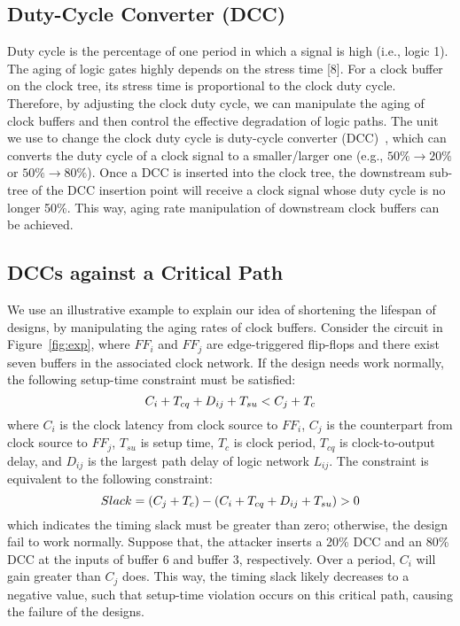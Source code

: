\subsection{Duty-Cycle Converter (DCC)}
Duty cycle is the percentage of one period in which a signal is high (i.e., logic 1). The aging of logic gates highly depends on the stress time [8]. For a clock buffer on the clock tree, its stress time is proportional to the clock duty cycle. Therefore, by adjusting the clock duty cycle, we can manipulate the aging of clock buffers and then control the effective degradation of logic paths. The unit we use to change the clock duty cycle is duty-cycle converter (DCC)~\cite{wu2018maui}, which can converts the duty cycle of a clock signal to a smaller/larger one (e.g., $50\% \rightarrow 20\%$ or $50\% \rightarrow 80\%$). Once a DCC is inserted into the clock tree, the downstream sub-tree of the DCC insertion point will receive a clock signal whose duty cycle is no longer 50\%. This way, aging rate manipulation of downstream clock buffers can be achieved.
\subsection{DCCs against a Critical Path}
We use an illustrative example to explain our idea of shortening the lifespan of designs, by manipulating the aging rates of clock buffers. Consider the circuit in Figure~\ref{fig:exp}, where $FF_{i}$ and $FF_{j}$ are edge-triggered flip-flops and there exist seven buffers in the associated clock network. If the design needs work normally, the following setup-time constraint must be satisfied:
\begin{equation}
	\label{eq:setup}
	\fontsize{8}{9} \selectfont
	C_{i} + T_{cq} + D_{ij} + T_{su} < C_{j} + T_{c}
\end{equation}
where $C_{i}$ is the clock latency from clock source to $FF_{i}$, $C_{j}$ is the counterpart from clock source to $FF_{j}$, $T_{su}$ is setup time, $T_{c}$ is clock period, $T_{cq}$ is clock-to-output delay, and $D_{ij}$ is the largest path delay of logic network $L_{ij}$. The constraint is equivalent to the following constraint: 
\begin{equation}
	\label{eq:setup}
	Slack = (C_{j} + T_{c}) - (C_{i}  + T_{cq} + D_{ij} + T_{su}) > 0 
	\fontsize{8}{9} \selectfont
\end{equation}
which indicates the timing slack must be greater than zero; otherwise, the design fail to work normally. Suppose that, the attacker inserts a 20\% DCC and an 80\% DCC at the inputs of buffer 6 and buffer 3, respectively. Over a period, $C_{i}$ will gain greater than $C_{j}$ does. This way, the timing slack likely decreases to a negative value, such that setup-time violation occurs on this critical path, causing the failure of the designs.